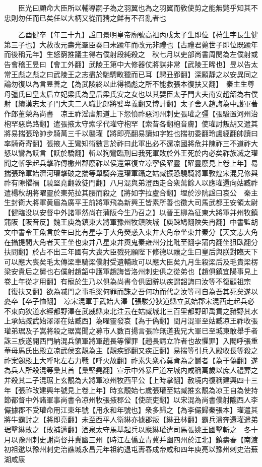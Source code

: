 　　臣光曰顧命大臣所以輔導嗣子為之羽翼也為之羽翼而敎使剪之能無斃乎知其不忠則勿任而已矣任以大柄又從而猜之鮮有不召亂者也

　　乙酉健卒【年三十九】諡曰景明皇帝廟號高祖丙戌太子生即位【苻生字長生健第三子也】大赦改元夀光羣臣奏曰未踰年而改元非禮也【古禮君薨世子即位既踰年而後稱元年】生怒窮推議主得右僕射段純殺之　秋七月以吏部尚書周閔為左僕射或告會稽王昱曰【會工外翻】武陵王第中大修器仗將謀非常【武陵王晞也】昱以告太常王彪之彪之曰武陵王之志盡於馳騁畋獵而已耳【騁丑郢翻】深願靜之以安異同之論勿復以為言昱善之【為武陵終以此得禍彪之所不能救張本復扶又翻】　秦主生尊母彊氏曰皇太后立妃梁氏為皇后梁氏安之女也以其嬖臣太子門大夫南安趙韶為右僕射【續漢志太子門大夫二人職比郎將嬖卑義翻又博計翻】太子舍人趙誨為中護軍著作郎董榮為尚書　凉王祚淫虐無道上下怨憤祚惡河州刺史張瓘之彊【張駿置河州治枹罕惡烏路翻】遣張掖太守索孚代瓘守枹罕【索昔各翻枹音膚】使瓘討叛胡又遣其將易揣張玲帥步騎萬三千以襲瓘【將即亮翻易讀如字姓也揣初委翻玲盧經翻帥讀曰率騎奇寄翻】張掖人王鸞知術數言於祚曰此軍出必不還凉國將危并陳祚三不道祚大怒以鸞為訞言【訞於驕翻】斬以狥鸞臨刑曰我死軍敗於外王死於内必矣祚族㓕之瓘聞之斬孚起兵擊祚傳檄州郡廢祚以侯還第復立凉寧侯曜靈【曜靈廢見上卷上年】易揣張玲軍始濟河瓘擊破之揣等單騎奔還瓘軍躡之姑臧振恐驍騎將軍敦煌宋混兄修與祚有隙懼禍【驍堅堯翻敦徒門翻】八月混與弟澄西走合衆萬餘人以應瓘還向姑臧祚遣楊秋胡將曜靈於東苑拉其腰而殺之【將如字拉盧合翻】埋於沙阬諡曰哀公　秦主生封衛大將軍黄眉為廣平王前將軍飛為新興王皆素所善也徵大司馬武都王安領太尉【健臨没以安督中外諸軍然尚在蒲阪今生乃召之】以晉王柳為征東大將軍并州牧鎮蒲阪【阪音反】魏王庾為鎮東大將軍豫州牧鎮陜城【庾踈鳩翻陜失冉翻】中書監胡文中書令王魚言於生曰比有星孛于大角熒惑入東井大角帝坐東井秦分【天文志大角在攝提間大角者天王坐也東井八星東井輿鬼秦雍州分比毗至翻孛蒲内翻坐狙臥翻分扶問翻】於占不出三年國有大喪大臣戮死願陛下修德以禳之生曰皇后與朕對臨天下可以應大喪矣毛太傳梁車騎梁僕射受遺輔政可以應大臣矣九月生殺梁后及毛貴梁楞梁安貴后之舅也右僕射趙韶中護軍趙誨皆洛州刺史俱之從弟也【趙俱鎮宜陽事見上卷上年從才用翻】有寵於生乃以俱為尚書令俱固辭以疾謂韶誨曰汝等不復顧祖宗【復扶又翻】欲為㓕門之事毛梁何罪而誅之吾何功而代之汝等可自為吾其死矣遂以憂卒【卒子恤翻】　凉宋混軍于武始大澤【張駿分狄道縣立武始郡宋混西走起兵必不東向狄道水經都野澤在武威縣東北注云在姑臧城北三百里都野即禹貢之豬野其水上承姑臧武始澤澤在姑臧西】為曜靈發哀【為于偽翻】閏月混軍至姑臧凉王祚收張瓘弟琚及子嵩將殺之琚嵩聞之募市人數百揚言張祚無道我兄大軍已至城東敢舉手者誅三族遂開西門納混兵領軍將軍趙長等懼罪【趙長請立祚者也故懼罪】入閣呼張重華母馬氏出殿立凉武侯玄靚為主【靚疾郢翻又疾正翻】易揣等引兵入殿收長等殺之祚案劔殿上大呼叱左右力戰【呼火故翻】祚素失衆心莫肯為之鬭者【為于偽翻】遂為兵人所殺混等梟其首【梟堅堯翻】宣示中外暴尸道左城内咸稱萬歲以庶人禮葬之并殺其二子混琚上玄靚為大將軍凉州牧西平公【上時掌翻】赦境内復稱建興四十三年【張祚改建興年號見上卷上年】時玄靚始七歲張瓘至姑臧推玄靚為凉王自為使持節都督中外諸軍事尚書令凉州牧張掖郡公【使疏吏翻】以宋混為尚書僕射隴西人李儼據郡不受瓘命用江東年號【用永和年號也】衆多歸之【為李儼歸秦張本】瓘遣其將牛霸討之【將即亮翻】未至西平人衛綝亦據郡叛【綝丑林翻】霸兵潰奔還瓘遣弟琚擊綝敗之【敗補邁翻】酒泉太守馬基起兵以應綝瓘遣司馬張姚王國擊斬之　冬十月以豫州刺史謝尚督并冀幽三州【時江左僑立青冀并幽四州於江北】鎮夀春【南渡初祖逖以豫州刺史治譙城永昌元年祖約退屯夀春成帝咸和四年庾亮以豫州刺史治蕪湖咸康